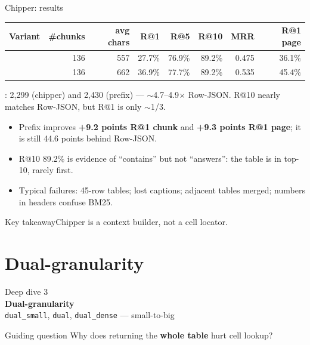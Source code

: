 \documentclass[aspectratio=169,11pt]{beamer}
\newcommand{\code}[1]{\texttt{\detokenize{#1}}}
\newcommand{\keyidea}[1]{%
  \begin{center}\begin{block}{\small Key takeaway}\centering #1\end{block}\end{center}}
\begin{document}
\begin{frame}{Chipper: results}
  \begin{center}
  \footnotesize
  \setlength{\tabcolsep}{4pt}
  \renewcommand{\arraystretch}{1.15}
  \begin{tabular}{@{}lrrrrrrr@{}}
    \toprule
    \textbf{Variant} & \textbf{\#chunks} & \textbf{avg chars} &
      \textbf{R@1} & \textbf{R@5} & \textbf{R@10} & \textbf{MRR} &
      \textbf{R@1 page} \\
    \midrule
    \code{chipper} & 136 & 557 & 27.7\% & 76.9\% & 89.2\% & 0.475 & 36.1\% \\
    \code{chipper_prefix} & 136 & 662 & 36.9\% & 77.7\% & 89.2\% & 0.535 & 45.4\% \\
    \bottomrule
  \end{tabular}
  \end{center}

  {\footnotesize
  \code{chars@1}: 2,299 (chipper) and 2,430 (prefix) --- $\sim$4.7--4.9$\times$
  Row-JSON. R@10 nearly matches Row-JSON, but R@1 is only $\sim$1/3.}

  \begin{itemize}\footnotesize
    \item Prefix improves \textbf{+9.2 points R@1 chunk} and
      \textbf{+9.3 points R@1 page}; it is still 44.6 points behind Row-JSON.
    \item R@10 89.2\% is evidence of ``contains'' but not ``answers'':
      the table is in top-10, rarely first.
    \item Typical failures: 45-row tables; lost captions; adjacent tables
      merged; numbers in headers confuse BM25.
  \end{itemize}

  \keyidea{Chipper is a context builder, not a cell locator.}
\end{frame}


\section{Dual-granularity}

\begin{frame}[plain]
  \vfill
  \begin{center}
    {\color{brand}\Large Deep dive 3}\\[0.6em]
    {\huge\bfseries Dual-granularity}\\[0.4em]
    {\large \texttt{dual\_small}, \texttt{dual}, \texttt{dual\_dense} --- small-to-big}
  \end{center}
  \vfill
  \begin{block}{Guiding question}
    \centering
    Why does returning the \textbf{whole table} hurt cell lookup?
  \end{block}
\end{frame}
\end{document}
